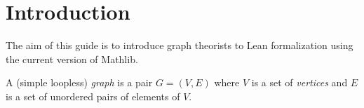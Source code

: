 %
\chapter{Introduction}

The aim of this guide is to introduce graph theorists to Lean formalization using the current version of Mathlib.

\begin{definition}
    A (simple loopless) \emph{graph} is a pair $G = (V, E)$ where $V$ is a set of \emph{vertices} and $E$ is a set of unordered pairs of elements of $V$.
\end{definition}